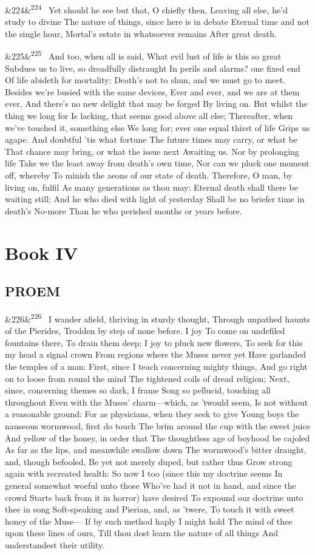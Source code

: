 \documentclass[12pt]{article}
\newcommand{\para}[1][]{\par\noindent\ifx&#1&\else\textsuperscript{\footnotesize #1}~\fi}
\begin{document}
\para[224] Yet should he see but that, O chiefly then, Leaving all else, he'd study to divine The nature of things, since here is in debate Eternal time and not the single hour, Mortal's estate in whatsoever remains After great death.

\para[225] And too, when all is said, What evil lust of life is this so great Subdues us to live, so dreadfully distraught In perils and alarms? one fixed end Of life abideth for mortality; Death's not to shun, and we must go to meet. Besides we're busied with the same devices, Ever and ever, and we are at them ever, And there's no new delight that may be forged By living on. But whilst the thing we long for Is lacking, that seems good above all else; Thereafter, when we've touched it, something else We long for; ever one equal thirst of life Grips us agape. And doubtful 'tis what fortune The future times may carry, or what be That chance may bring, or what the issue next Awaiting us. Nor by prolonging life Take we the least away from death's own time, Nor can we pluck one moment off, whereby To minish the aeons of our state of death. Therefore, O man, by living on, fulfil As many generations as thou may: Eternal death shall there be waiting still; And he who died with light of yesterday Shall be no briefer time in death's No-more Than he who perished months or years before.

\section*{Book IV}

\subsection*{PROEM}

\para[226] I wander afield, thriving in sturdy thought, Through unpathed haunts of the Pierides, Trodden by step of none before. I joy To come on undefiled fountains there, To drain them deep; I joy to pluck new flowers, To seek for this my head a signal crown From regions where the Muses never yet Have garlanded the temples of a man: First, since I teach concerning mighty things, And go right on to loose from round the mind The tightened coils of dread religion; Next, since, concerning themes so dark, I frame Song so pellucid, touching all throughout Even with the Muses' charm---which, as 'twould seem, Is not without a reasonable ground: For as physicians, when they seek to give Young boys the nauseous wormwood, first do touch The brim around the cup with the sweet juice And yellow of the honey, in order that The thoughtless age of boyhood be cajoled As far as the lips, and meanwhile swallow down The wormwood's bitter draught, and, though befooled, Be yet not merely duped, but rather thus Grow strong again with recreated health: So now I too (since this my doctrine seems In general somewhat woeful unto those Who've had it not in hand, and since the crowd Starts back from it in horror) have desired To expound our doctrine unto thee in song Soft-speaking and Pierian, and, as 'twere, To touch it with sweet honey of the Muse--- If by such method haply I might hold The mind of thee upon these lines of ours, Till thou dost learn the nature of all things And understandest their utility.
\end{document}
